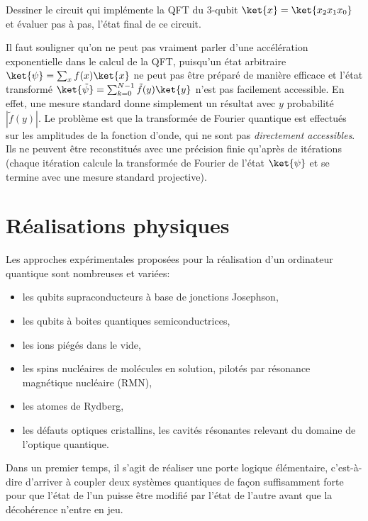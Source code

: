 \begin{exercise}
Dessiner le circuit qui implémente la QFT du 3-qubit $\ket{x}=\ket{x_2x_1x_0}$
et évaluer pas à pas, l'état final de ce circuit.
\end{exercise}

\begin{remark}
Il faut souligner qu'on ne peut pas vraiment parler d'une accélération
exponentielle dans le calcul de la QFT, puisqu'un état arbitraire
$\ket{\psi}=\sum_{x}f(x)\ket{x}$ ne peut pas être préparé de manière efficace et
l'état transformé $\ket{\tilde{\psi}}=\sum_{k=0}^{N-1}{\tilde{f}(y)}\ket{y}$
n'est pas facilement accessible. En effet, une mesure standard donne simplement
un résultat avec $y$ probabilité $|\tilde{f}(y)|$. Le problème est que la
transformée de Fourier quantique est effectués sur les amplitudes de la fonction
d'onde, qui ne sont pas \emph{directement accessibles}. Ils ne peuvent être
reconstitués avec une précision finie qu'après de itérations (chaque itération
calcule la transformée de Fourier de l'état $\ket{\psi}$ et se termine avec une
mesure standard projective).
\end{remark}

\section{Réalisations physiques}

Les approches expérimentales proposées pour la réalisation d'un ordinateur
quantique sont nombreuses et variées:
\begin{itemize}
\item les qubits supraconducteurs à base de jonctions Josephson,
\item les qubits à boites quantiques semiconductrices,
\item les ions piégés dans le vide,
\item les spins nucléaires de molécules en solution, pilotés par résonance
magnétique nucléaire (RMN),
\item les atomes de Rydberg,
\item les défauts optiques cristallins, les cavités résonantes relevant du
domaine de l'optique quantique.
\end{itemize}

Dans un premier temps, il s'agit de réaliser une porte logique élémentaire,
c'est-à-dire d'arriver à coupler deux systèmes quantiques de façon suffisamment
forte pour que l'état de l'un puisse être modifié par l'état de l'autre avant
que la décohérence n'entre en jeu.

